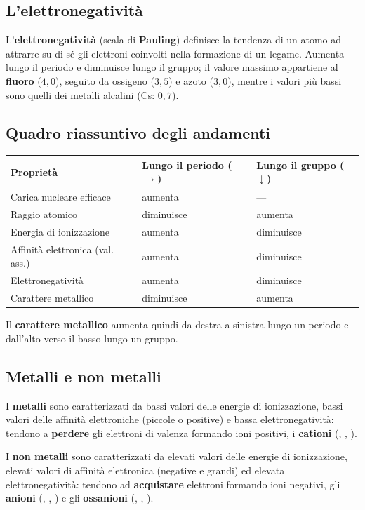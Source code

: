 \documentclass[11pt, a4paper, openright]{book}
\begin{document}
\subsection{L'elettronegatività}
L'\textbf{elettronegatività} (scala di \textbf{Pauling}) definisce la tendenza di un atomo ad attrarre su di sé gli elettroni coinvolti nella formazione di un legame. Aumenta lungo il periodo e diminuisce lungo il gruppo; il valore massimo appartiene al \textbf{fluoro} ($4{,}0$), seguito da ossigeno ($3{,}5$) e azoto ($3{,}0$), mentre i valori più bassi sono quelli dei metalli alcalini (Cs: $0{,}7$).

\subsection{Quadro riassuntivo degli andamenti}
\begin{center}
\begin{tabular}{lll}
\toprule
\textbf{Proprietà} & \textbf{Lungo il periodo ($\rightarrow$)} & \textbf{Lungo il gruppo ($\downarrow$)} \\
\midrule
Carica nucleare efficace & aumenta & --- \\
Raggio atomico & diminuisce & aumenta \\
Energia di ionizzazione & aumenta & diminuisce \\
Affinità elettronica (val. ass.) & aumenta & diminuisce \\
Elettronegatività & aumenta & diminuisce \\
Carattere metallico & diminuisce & aumenta \\
\bottomrule
\end{tabular}
\end{center}
Il \textbf{carattere metallico} aumenta quindi da destra a sinistra lungo un periodo e dall'alto verso il basso lungo un gruppo.

\subsection{Metalli e non metalli}
I \textbf{metalli} sono caratterizzati da bassi valori delle energie di ionizzazione, bassi valori delle affinità elettroniche (piccole o positive) e bassa elettronegatività: tendono a \textbf{perdere} gli elettroni di valenza formando ioni positivi, i \textbf{cationi} (, , ).

I \textbf{non metalli} sono caratterizzati da elevati valori delle energie di ionizzazione, elevati valori di affinità elettronica (negative e grandi) ed elevata elettronegatività: tendono ad \textbf{acquistare} elettroni formando ioni negativi, gli \textbf{anioni} (, , ) e gli \textbf{ossanioni} (, , ).
\end{document}
